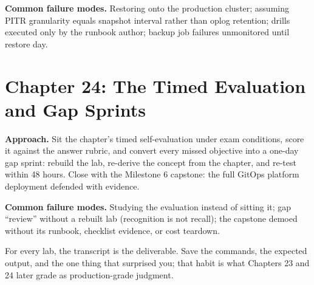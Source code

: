 \textbf{Common failure modes.} Restoring onto the production cluster; assuming PITR granularity
equals snapshot interval rather than oplog retention; drills executed only by the runbook author;
backup job failures unmonitored until restore day.

\section{Chapter 24: The Timed Evaluation and Gap Sprints}
\textbf{Approach.} Sit the chapter's timed self-evaluation under exam conditions, score it
against the answer rubric, and convert every missed objective into a one-day gap sprint: rebuild
the lab, re-derive the concept from the chapter, and re-test within 48 hours. Close with the
Milestone 6 capstone: the full GitOps platform deployment defended with evidence.

\textbf{Common failure modes.} Studying the evaluation instead of sitting it; gap ``review''
without a rebuilt lab (recognition is not recall); the capstone demoed without its runbook,
checklist evidence, or cost teardown.

\begin{tipbox}
For every lab, the transcript is the deliverable. Save the commands, the expected output, and the
one thing that surprised you; that habit is what Chapters 23 and 24 later grade as
production-grade judgment.
\end{tipbox}
